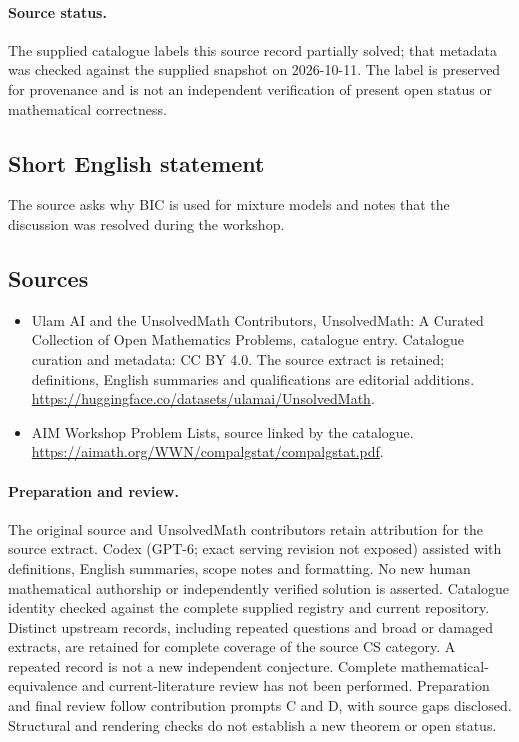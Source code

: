 \documentclass[11pt]{article}
\begin{document}
\paragraph{Source status.}
The supplied catalogue labels this source record partially solved; that metadata was checked against the supplied snapshot on 2026-10-11. The label is preserved for provenance and is not an independent verification of present open status or mathematical correctness.
\subsection{Short English statement}
The source asks why BIC is used for mixture models and notes that the discussion was resolved during the workshop.
\subsection{Sources}
\begin{itemize}
\item[\hypertarget{source:statement:1}{S1}] Ulam AI and the UnsolvedMath Contributors, UnsolvedMath: A Curated Collection of Open Mathematics Problems, catalogue entry. Catalogue curation and metadata: CC BY 4.0. The source extract is retained; definitions, English summaries and qualifications are editorial additions.
\url{https://huggingface.co/datasets/ulamai/UnsolvedMath}.
\item[\hypertarget{source:statement:2}{S2}] AIM Workshop Problem Lists, source linked by the catalogue.
\url{https://aimath.org/WWN/compalgstat/compalgstat.pdf}.
\end{itemize}
\paragraph{Preparation and review.}
The original source and UnsolvedMath contributors retain attribution for the source extract. Codex (GPT-6; exact serving revision not exposed) assisted with definitions, English summaries, scope notes and formatting. No new human mathematical authorship or independently verified solution is asserted. Catalogue identity checked against the complete supplied registry and current repository. Distinct upstream records, including repeated questions and broad or damaged extracts, are retained for complete coverage of the source CS category. A repeated record is not a new independent conjecture. Complete mathematical-equivalence and current-literature review has not been performed. Preparation and final review follow contribution prompts C and D, with source gaps disclosed. Structural and rendering checks do not establish a new theorem or open status.
\label{end:statement}
\end{document}
